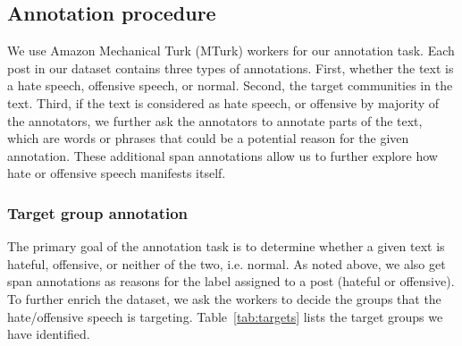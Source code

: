 \documentclass[letterpaper]{article} \usepackage{aaai21}  \usepackage{times}  \usepackage{helvet} \usepackage{courier}  \usepackage[hyphens]{url}  \usepackage{graphicx} \urlstyle{rm} \def\UrlFont{\rm}  \usepackage{natbib}  \usepackage{caption}
\begin{document}
\subsection{Annotation procedure}
We use Amazon Mechanical Turk (MTurk) workers for our annotation task. Each post in our dataset contains three types of annotations. First, whether the text is a hate speech, offensive speech, or normal. Second, the target communities in the text. Third, if the text is considered as hate speech, or offensive by majority of the annotators, we further ask the annotators to annotate parts of the text, which are words or phrases that could be a potential reason for the given annotation. These additional span annotations allow us to further explore how hate or offensive speech manifests itself.





\subsubsection{Target group annotation}
The primary goal of the annotation task is to determine whether a given text is hateful, offensive, or neither of the two, i.e. normal. As noted above, we also get span annotations as reasons for the label assigned to a post (hateful or offensive). To further enrich the dataset, we ask the workers to decide the groups that the hate/offensive speech is targeting. Table~\ref{tab:targets} lists the target groups we have identified.

\begin{table}[h]
\centering
{}
\caption{Target groups considered for the annotation.}
\label{tab:targets}
\end{table}
\end{document}
